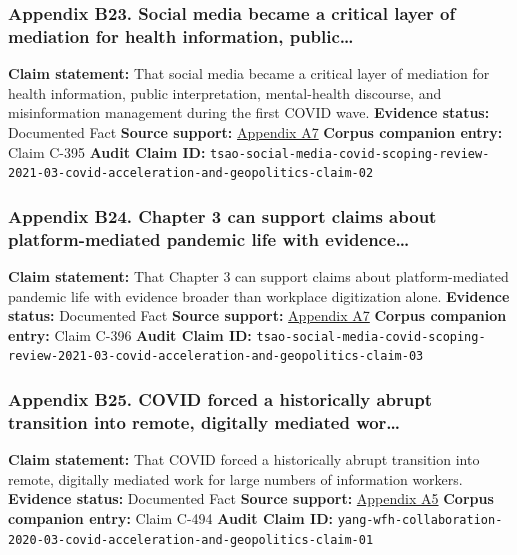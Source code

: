 \documentclass[
  american,
  11pt,
  letterpaper,
]{article}
\begin{document}
\subsubsection{Appendix B23. Social media became a critical layer of
mediation for health information,
public\ldots{}}\label{ch-03-appendix-b23-social-media-became-a-critical-layer-of-mediation-for-health-information-public}

\textbf{Claim statement:} That social media became a critical layer of
mediation for health information, public interpretation, mental-health
discourse, and misinformation management during the first COVID wave.
\textbf{Evidence status:} Documented Fact \textbf{Source support:}
\hyperref[ch-03-appendix-a7-what-social-media-told-about-us-in-the-time-of-covid-19-a-scoping-review]{Appendix
A7} \textbf{Corpus companion entry:} Claim C-395 \textbf{Audit Claim
ID:}
\texttt{tsao-social-media-covid-scoping-review-2021-03-covid-acceleration-and-geopolitics-claim-02}

\subsubsection{Appendix B24. Chapter 3 can support claims about
platform-mediated pandemic life with
evidence\ldots{}}\label{ch-03-appendix-b24-chapter-3-can-support-claims-about-platform-mediated-pandemic-life-with-evidence}

\textbf{Claim statement:} That Chapter 3 can support claims about
platform-mediated pandemic life with evidence broader than workplace
digitization alone. \textbf{Evidence status:} Documented Fact
\textbf{Source support:}
\hyperref[ch-03-appendix-a7-what-social-media-told-about-us-in-the-time-of-covid-19-a-scoping-review]{Appendix
A7} \textbf{Corpus companion entry:} Claim C-396 \textbf{Audit Claim
ID:}
\texttt{tsao-social-media-covid-scoping-review-2021-03-covid-acceleration-and-geopolitics-claim-03}

\subsubsection{Appendix B25. COVID forced a historically abrupt
transition into remote, digitally mediated
wor\ldots{}}\label{ch-03-appendix-b25-covid-forced-a-historically-abrupt-transition-into-remote-digitally-mediated-wor}

\textbf{Claim statement:} That COVID forced a historically abrupt
transition into remote, digitally mediated work for large numbers of
information workers. \textbf{Evidence status:} Documented Fact
\textbf{Source support:}
\hyperref[ch-03-appendix-a5-how-work-from-home-affects-collaboration-a-large-scale-study-of-information-workers-in-a-natural-experiment-during-covid-19]{Appendix
A5} \textbf{Corpus companion entry:} Claim C-494 \textbf{Audit Claim
ID:}
\texttt{yang-wfh-collaboration-2020-03-covid-acceleration-and-geopolitics-claim-01}
\end{document}
